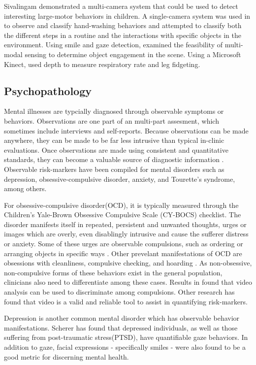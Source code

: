 \documentclass[11pt]{article}
\newcounter{list}
\begin{document}
Sivalingam \cite{sivalingam2012} demonstrated a multi-camera system that could be used to detect interesting large-motor behaviors in children. A single-camera system was used in \cite{fasching2016} to observe and classify hand-washing behaviors and attempted to classify both the different steps in a routine and the interactions with specific objects in the environment. Using smile and gaze detection, \cite{rehg2013} examined the feasibility of multi-modal sensing to determine object engagement in the scene. Using a Microsoft Kinect, \cite{burba2012} used depth to measure respiratory rate and leg fidgeting.

\subsection{Psychopathology}
Mental illnesses are typcially diagnosed through observable symptoms or behaviors. Observations are one part of an multi-part assesment, which sometimes include interviews and self-reports. Because observations can be made anywhere, they can be made to be far less intrusive than typical in-clinic evaluations. Once observations are made using consistent and quantitative standards, they can become a valuable source of diagnostic information \cite{hashemi2012}. Observable risk-markers have been compiled for mental disorders such as depression, obsessive-compulsive disorder, anxiety, and Tourette's syndrome, among others.

For obsessive-compulsive disorder(OCD), it is typically measured through the Children's Yale-Brown Obsessive Compulsive Scale (CY-BOCS) checklist. The disorder manifests itself in repeated, persistent and unwanted thoughts, urges or images which are overly, even disablingly intrusive and cause the sufferer distress or anxiety. Some of these urges are observable compulsions, such as ordering or arranging objects in specific ways \cite{radomsky2004}. Other prevelant manifestations of OCD are obsessions with cleanliness, compulsive checking, and hoarding \cite{abramowitz2003}. As non-obsessive, non-compulsive forms of these behaviors exist in the general population, clinicians also need to differentiate among these cases.  Results in \cite{zor2011} found that  video analysis can be used to discriminate among compulsions. Other research \cite{bernstein2017} has found that video is a valid and reliable tool to assist in  quantifying risk-markers.

Depression is another common mental disorder which has observable behavior manifestations. Scherer \cite{scherer2014} has found that depressed individuals, as well as those suffering from post-traumatic stress(PTSD), have quantifiable gaze behaviors. In addition to gaze, facial expressions - specifically smiles - were also found to be a good metric for discerning mental health.
\end{document}
